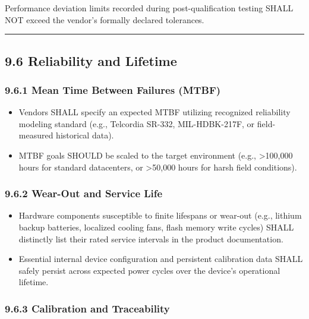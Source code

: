 \documentclass[
]{article}
\begin{document}
Performance deviation limits recorded during post-qualification testing
SHALL NOT exceed the vendor's formally declared tolerances.

\begin{center}\rule{0.5\linewidth}{0.5pt}\end{center}

\subsection{9.6 Reliability and
Lifetime}\label{reliability-and-lifetime}

\subsubsection{9.6.1 Mean Time Between Failures
(MTBF)}\label{mean-time-between-failures-mtbf}

\begin{itemize}
\item
  Vendors SHALL specify an expected MTBF utilizing recognized
  reliability modeling standard (e.g., Telcordia SR-332, MIL-HDBK-217F,
  or field-measured historical data).\\
\item
  MTBF goals SHOULD be scaled to the target environment (e.g.,
  \textgreater100,000 hours for standard datacenters, or
  \textgreater50,000 hours for harsh field conditions).
\end{itemize}

\subsubsection{9.6.2 Wear-Out and Service
Life}\label{wear-out-and-service-life}

\begin{itemize}
\item
  Hardware components susceptible to finite lifespans or wear-out (e.g.,
  lithium backup batteries, localized cooling fans, flash memory write
  cycles) SHALL distinctly list their rated service intervals in the
  product documentation.\\
\item
  Essential internal device configuration and persistent calibration
  data SHALL safely persist across expected power cycles over the
  device's operational lifetime.
\end{itemize}

\subsubsection{9.6.3 Calibration and
Traceability}\label{calibration-and-traceability}
\end{document}
